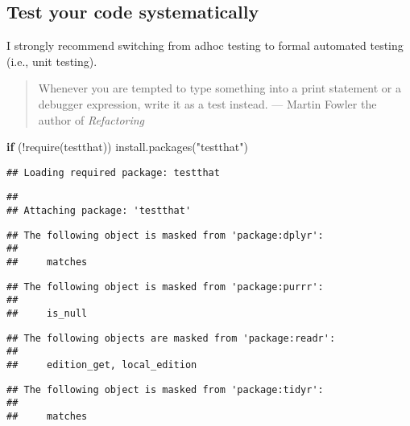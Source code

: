 \documentclass[
]{book}
\newenvironment{Shaded}{\begin{snugshade}}{\end{snugshade}}
\newcommand{\ControlFlowTok}[1]{\textcolor[rgb]{0.13,0.29,0.53}{\textbf{#1}}}
\newcommand{\FunctionTok}[1]{\textcolor[rgb]{0.00,0.00,0.00}{#1}}
\newcommand{\NormalTok}[1]{#1}
\newcommand{\SpecialCharTok}[1]{\textcolor[rgb]{0.00,0.00,0.00}{#1}}
\newcommand{\StringTok}[1]{\textcolor[rgb]{0.31,0.60,0.02}{#1}}
\begin{document}
\hypertarget{test-your-code-systematically}{%
\subsection{Test your code systematically}\label{test-your-code-systematically}}

I strongly recommend switching from adhoc testing to formal automated testing (i.e., unit testing).

\begin{quote}
Whenever you are tempted to type something into a print statement or a debugger expression, write it as a test instead. --- Martin Fowler the author of \emph{Refactoring}
\end{quote}

\begin{Shaded}
\begin{Highlighting}[]
\ControlFlowTok{if}\NormalTok{ (}\SpecialCharTok{!}\FunctionTok{require}\NormalTok{(testthat)) }\FunctionTok{install.packages}\NormalTok{(}\StringTok{"testthat"}\NormalTok{)}
\end{Highlighting}
\end{Shaded}

\begin{verbatim}
## Loading required package: testthat
\end{verbatim}

\begin{verbatim}
## 
## Attaching package: 'testthat'
\end{verbatim}

\begin{verbatim}
## The following object is masked from 'package:dplyr':
## 
##     matches
\end{verbatim}

\begin{verbatim}
## The following object is masked from 'package:purrr':
## 
##     is_null
\end{verbatim}

\begin{verbatim}
## The following objects are masked from 'package:readr':
## 
##     edition_get, local_edition
\end{verbatim}

\begin{verbatim}
## The following object is masked from 'package:tidyr':
## 
##     matches
\end{verbatim}
\end{document}
